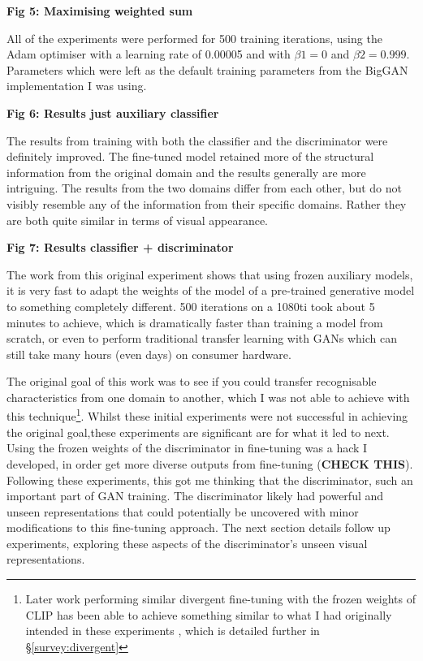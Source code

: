 \textbf{Fig 5: Maximising weighted sum}

All of the experiments were performed for 500 training iterations, using the Adam optimiser \citep{kingma2015adam} with a learning rate of 0.00005 and with $\beta1 = 0$ and $\beta2 = 0.999$. 
Parameters which were left as the default training parameters from the BigGAN implementation I was using. 


\textbf{Fig 6: Results just auxiliary classifier}

The results from training with both the classifier and the discriminator were definitely improved. 
The fine-tuned model retained more of the structural information from the original domain and the results generally are more intriguing. 
The results from the two domains differ from each other, but do not visibly resemble any of the information from their specific domains. 
Rather they are both quite similar in terms of visual appearance.

\textbf{Fig 7: Results classifier + discriminator}

The work from this original experiment shows that using frozen auxiliary models, it is very fast to adapt the weights of the model of a pre-trained generative model to something completely different. 
500 iterations on a 1080ti took about 5 minutes to achieve, which is dramatically faster than training a model from scratch, or even to perform traditional transfer learning with GANs which can still take many hours (even days) on consumer hardware. 

The original goal of this work was to see if you could transfer recognisable characteristics from one domain to another, which I was not able to achieve with this technique\footnote{Later work performing similar divergent fine-tuning with the frozen weights of CLIP has been able to achieve something similar to what I had originally intended in these experiments \citep{gal2022stylegan}, which is detailed further in \S \ref{survey:divergent}}. 
Whilst these initial experiments were not successful in achieving the original goal,these experiments are significant are for what it led to next. 
Using the frozen weights of the discriminator in fine-tuning was a hack I developed, in order get more diverse outputs from fine-tuning (\textbf{CHECK THIS}). 
Following these experiments, this got me thinking that the discriminator, such an important part of GAN training. The discriminator likely had powerful and unseen representations that could potentially be uncovered with minor modifications to this fine-tuning approach. 
The next section details follow up experiments, exploring these aspects of the discriminator's unseen visual representations.

